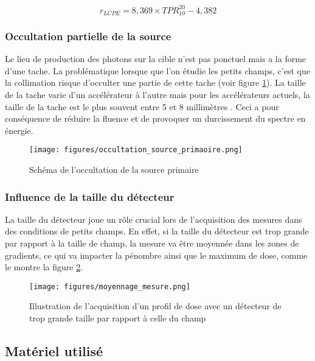 \documentclass{article}
\begin{document}
\begin{equation}
  r_{LCPE} = 8,369 \times TPR^{20}_{10} - 4,382
  \label{eq_rLCPE}
\end{equation}

\subsubsection{Occultation partielle de la source}

Le lieu de production des photons sur la cible n'est pas ponctuel mais a la forme d'une tache. La problématique lorsque que l'on étudie les petits champs, c'est que la collimation risque d'occulter une partie de cette tache (voir figure \ref*{fig_occultation_source}). La taille de la tache varie d'un accélérateur à l'autre mais pour les accélérateurs actuels, la taille de la tache est le plus souvent entre 5 et 8 millimètres \cite{cours_Dufreneix}. Ceci a pour conséquence de réduire la fluence et de provoquer un durcissement du spectre en énergie.

\begin{figure}[h]
  \centering
  \texttt{[image: figures/occultation\_source\_primaoire.png]}
  \caption{Schéma de l'occultation de la source primaire}
  \label{fig_occultation_source}
\end{figure}

\subsubsection{Influence de la taille du détecteur}

La taille du détecteur joue un rôle crucial lors de l'acquisition des mesures dans des conditions de petits champs. En effet, si la taille du détecteur est trop grande par rapport à la taille de champ, la mesure va être moyennée dans les zones de gradients, ce qui va impacter la pénombre ainsi que le maximum de dose, comme le montre la figure \ref*{fig_moyennage_mesure}.

\begin{figure}[h]
  \centering
  \texttt{[image: figures/moyennage\_mesure.png]}
  \caption{Illustration de l'acquisition d'un profil de dose avec un détecteur de trop grande taille par rapport à celle du champ}
  \label{fig_moyennage_mesure}
\end{figure}

\newpage
\subsection{Matériel utilisé}
\end{document}
